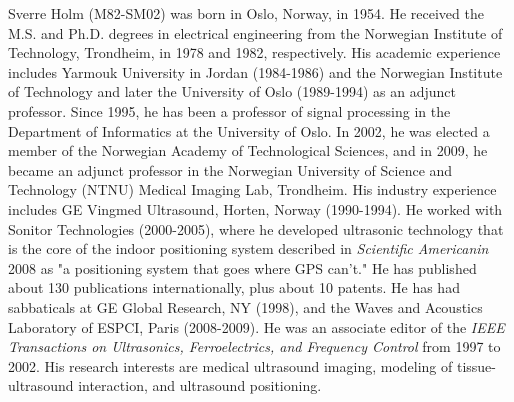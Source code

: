 \documentclass[draftcls]{IEEEtran}
\begin{document}
\begin{IEEEbiography}{Sverre Holm}
(M82-SM02) was born in Oslo, Norway, in 1954. He received the M.S. and Ph.D. degrees in electrical engineering from the Norwegian Institute of Technology, Trondheim, in 1978 and 1982, respectively. His academic experience includes Yarmouk University in Jordan (1984-1986) and the Norwegian Institute of Technology and later the University of Oslo (1989-1994) as an adjunct professor. Since 1995, he has been a professor of signal processing in the Department of Informatics at the University of Oslo. In 2002, he was elected a member of the Norwegian Academy of Technological Sciences, and in 2009, he became an adjunct professor in the Norwegian University of Science and Technology (NTNU) Medical Imaging Lab, Trondheim. His industry experience includes GE Vingmed Ultrasound, Horten, Norway (1990-1994). He worked with Sonitor Technologies (2000-2005), where he developed ultrasonic technology that is the core of the indoor positioning system described in \textit{Scientific Americanin} 2008 as "a positioning system that goes where GPS can't." He has published about 130 publications internationally, plus about 10 patents. He has had sabbaticals at GE Global Research, NY (1998), and the Waves and Acoustics Laboratory of ESPCI, Paris (2008-2009). He was an associate editor of the \textit{IEEE Transactions on Ultrasonics, Ferroelectrics, and Frequency Control} from 1997 to 2002. His research interests are medical ultrasound imaging, modeling of tissue-ultrasound interaction, and ultrasound positioning.
\end{IEEEbiography}

\vfill







\end{document}
